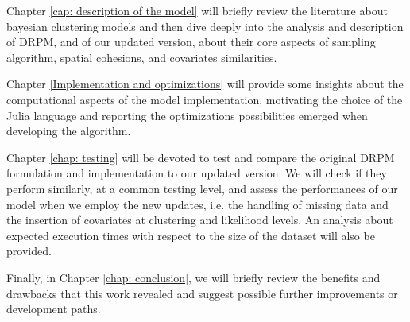 \documentclass[12pt,	%
	a4paper,		%
	twoside,		%
	openright,		%
	titlepage,%
	]{book}
\theoremstyle{definition}
\begin{document}
Chapter \ref{cap: description of the model} will briefly review the literature about bayesian clustering models and then dive deeply into the analysis and description of DRPM, and of our updated version, about their core aspects of sampling algorithm, spatial cohesions, and covariates similarities.

Chapter \ref{Implementation and optimizations} will provide some insights about the computational aspects of the model implementation, motivating the choice of the Julia language and reporting the optimizations possibilities emerged when developing the algorithm.

Chapter \ref{chap: testing} will be devoted to test and compare the original DRPM formulation and implementation to our updated version. We will check if they perform similarly, at a common testing level, and assess the performances of our model when we employ the new updates, i.e. the handling of missing data and the insertion of covariates at clustering and likelihood levels. An analysis about expected execution  times with respect to the size of the dataset will also be provided.
 
Finally, in Chapter \ref{chap: conclusion}, we will briefly review the benefits and drawbacks that this work revealed and suggest possible further improvements or development paths.





\end{document}
